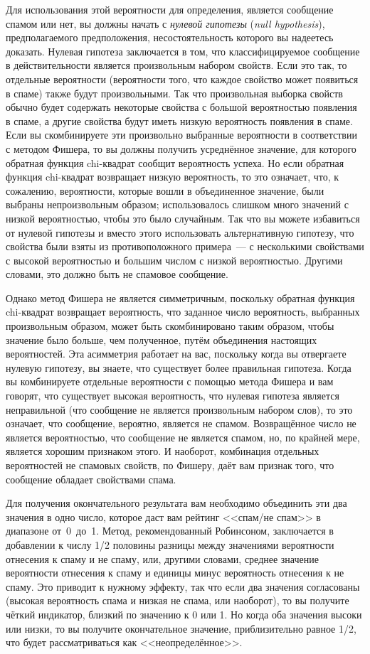 Для использования этой вероятности для определения, является сообщение спамом или нет,
вы должны начать с \textit{нулевой гипотезы} (\textit{null hypothesis}), предполагаемого
предположения, несостоятельность которого вы надеетесь доказать. Нулевая гипотеза
заключается в том, что классифицируемое сообщение в действительности является произвольным
набором свойств.  Если это так, то отдельные вероятности (вероятности того, что каждое
свойство может появиться в спаме) также будут произвольными.  Так что произвольная
выборка свойств обычно будет содержать некоторые свойства с большой вероятностью появления
в спаме, а другие свойства будут иметь низкую вероятность появления в спаме.  Если вы
скомбинируете эти произвольно выбранные вероятности в соответствии с методом Фишера, то вы
должны получить усреднённое значение, для которого обратная функция chi-квадрат сообщит
вероятность успеха.  Но если обратная функция chi-квадрат возвращает низкую вероятность,
то это означает, что, к сожалению, вероятности, которые вошли в объединенное значение, были
выбраны непроизвольным образом; использовалось слишком много значений с низкой
вероятностью, чтобы это было случайным. Так что вы можете избавиться от нулевой гипотезы и
вместо этого использовать альтернативную гипотезу, что свойства были взяты из
противоположного примера~--- с несколькими свойствами с высокой вероятностью и большим
числом с низкой вероятностью.  Другими словами, это должно быть не спамовое сообщение.

Однако метод Фишера не является симметричным, поскольку обратная функция chi-квадрат
возвращает вероятность, что заданное число вероятность, выбранных произвольным образом,
может быть скомбинировано таким образом, чтобы значение было больше, чем полученное, путём
объединения настоящих вероятностей.  Эта асимметрия работает на вас, поскольку когда вы
отвергаете нулевую гипотезу, вы знаете, что существует более правильная гипотеза.  Когда вы
комбинируете отдельные вероятности с помощью метода Фишера и вам говорят, что существует
высокая вероятность, что нулевая гипотеза является неправильной (что сообщение не является
произвольным набором слов), то это означает, что сообщение, вероятно, является не спамом.
Возвращённое число не является вероятностью, что сообщение не является спамом, но, по
крайней мере, является хорошим признаком этого.  И наоборот, комбинация отдельных
вероятностей не спамовых свойств, по Фишеру, даёт вам признак того, что сообщение обладает
свойствами спама.

Для получения окончательного результата вам необходимо объединить эти два значения в одно
число, которое даст вам рейтинг <<спам/не спам>> в диапазоне от~0~до~1.  Метод,
рекомендованный Робинсоном, заключается в добавлении к числу 1/2 половины разницы между
значениями вероятности отнесения к спаму и не спаму, или, другими словами, среднее
значение вероятности отнесения к спаму и единицы минус вероятность отнесения к не спаму.
Это приводит к нужному эффекту, так что если два значения согласованы (высокая вероятность
спама и низкая не спама, или наоборот), то вы получите чёткий индикатор, близкий по
значению к 0 или 1.  Но когда оба значения высоки или низки, то вы получите окончательное
значение, приблизительно равное 1/2, что будет рассматриваться как <<неопределённое>>.

